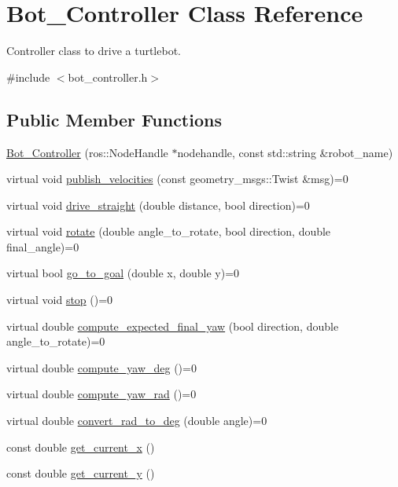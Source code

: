 \hypertarget{class_bot___controller}{}\section{Bot\+\_\+\+Controller Class Reference}
\label{class_bot___controller}


Controller class to drive a turtlebot.  




{\ttfamily \#include $<$bot\+\_\+controller.\+h$>$}

\subsection*{Public Member Functions}
\begin{DoxyCompactItemize}
\item 
\hyperlink{class_bot___controller_a05104e1b41f7c9cd9cdfe80bbbd53a7d}{Bot\+\_\+\+Controller} (ros\+::\+Node\+Handle $\ast$nodehandle, const std\+::string \&robot\+\_\+name)
\item 
virtual void \hyperlink{class_bot___controller_ae357ee9ea3ec7a5000f39532fc52fa72}{publish\+\_\+velocities} (const geometry\+\_\+msgs\+::\+Twist \&msg)=0
\item 
virtual void \hyperlink{class_bot___controller_af1137bb5b154232042e7701a0c24c100}{drive\+\_\+straight} (double distance, bool direction)=0
\item 
virtual void \hyperlink{class_bot___controller_ab83b7a259633a0e5c8855159b0027303}{rotate} (double angle\+\_\+to\+\_\+rotate, bool direction, double final\+\_\+angle)=0
\item 
virtual bool \hyperlink{class_bot___controller_a3170c3d67d2c4f92226aa8fe9bc84558}{go\+\_\+to\+\_\+goal} (double x, double y)=0
\item 
virtual void \hyperlink{class_bot___controller_a068f0e65e236f7ee9748c20b21a11d7f}{stop} ()=0
\item 
virtual double \hyperlink{class_bot___controller_abd0ba787692f53c17fed466e8850e1bc}{compute\+\_\+expected\+\_\+final\+\_\+yaw} (bool direction, double angle\+\_\+to\+\_\+rotate)=0
\item 
virtual double \hyperlink{class_bot___controller_a0c54c607b8eda10c2c3d287f2d939950}{compute\+\_\+yaw\+\_\+deg} ()=0
\item 
virtual double \hyperlink{class_bot___controller_ace0990064539cca6fff70a98655623c4}{compute\+\_\+yaw\+\_\+rad} ()=0
\item 
virtual double \hyperlink{class_bot___controller_ae217e781d11e9a70b8a02dacb0e30683}{convert\+\_\+rad\+\_\+to\+\_\+deg} (double angle)=0
\item 
const double \hyperlink{class_bot___controller_a2efd33efbb2d3c8caa52e04a049b5971}{get\+\_\+current\+\_\+x} ()
\item 
const double \hyperlink{class_bot___controller_a5985b03ff6787846a5abf5cd85ed6ae2}{get\+\_\+current\+\_\+y} ()
\end{DoxyCompactItemize}
